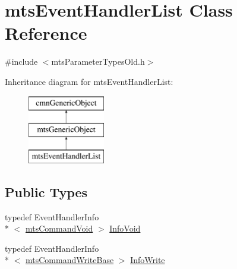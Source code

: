 \hypertarget{classmts_event_handler_list}{\section{mts\-Event\-Handler\-List Class Reference}
\label{classmts_event_handler_list}
}


{\ttfamily \#include $<$mts\-Parameter\-Types\-Old.\-h$>$}

Inheritance diagram for mts\-Event\-Handler\-List\-:\begin{figure}[H]
\begin{center}
\leavevmode
\includegraphics[height=3.000000cm]{db/dfa/classmts_event_handler_list}
\end{center}
\end{figure}
\subsection*{Public Types}
\begin{DoxyCompactItemize}
\item 
typedef Event\-Handler\-Info\\*
$<$ \hyperlink{classmts_command_void}{mts\-Command\-Void} $>$ \hyperlink{classmts_event_handler_list_a7b977bcaba00a2616c48b250d02d53d5}{Info\-Void}
\item 
typedef Event\-Handler\-Info\\*
$<$ \hyperlink{classmts_command_write_base}{mts\-Command\-Write\-Base} $>$ \hyperlink{classmts_event_handler_list_ac4f93c3df99ddcff2ecc44e52f76ffc8}{Info\-Write}
\end{DoxyCompactItemize}
